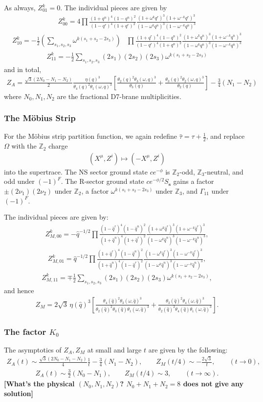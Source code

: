 \documentclass[12pt]{article}
\newcommand{\ie}{\begin{equation}\begin{aligned}}
\newcommand{\fe}{\end{aligned}\end{equation}}
\begin{document}
As always, $Z_{01}^k=0$. The individual pieces are given by
\ie
Z_{00}^k = 4\prod \frac{(1+q^n)^4(1-q^n)^2}{(1-q^r)^4(1+q^r)^2} \frac{(1+\omega^k q^r)^3(1+\omega^{-k}q^r)^3}{(1-\omega^kq^n)^3 (1-\omega^{-k}q^n)^3}
\fe
\ie
Z_{10}^k = -\frac{1}{2}\left(\sum_{s_1,s_2,s_3}\omega^{k(s_1+s_2-2s_3)}\right)&\prod \frac{(1+q^r)^4(1-q^n)^2}{(1-q^r)^4(1+q^n)^2}\frac{(1+\omega^k q^n)^3(1+\omega^{-k}q^n)^3}{(1-\omega^kq^n)^3 (1-\omega^{-k}q^n)^3}
\fe
\ie
Z_{11}^k =-\frac{1}{2}\sum_{s_1,s_2,s_3}(2s_1)(2s_2)(2s_3)\omega^{k(s_1+s_2-2s_3)}
\fe
and in total,
\ie
Z_A = \frac{\sqrt{3}(2N_0-N_1-N_2)}{2}
\frac{\eta(q)^3}{\theta_4(q)^2\theta_1(\omega,q)^3}
\left[
\frac{\theta_2(q)^2\theta_3(\omega,q)^3}{\theta_3(q)}
+
\frac{\theta_3(q)^2\theta_2(\omega,q)^3}{\theta_2(q)}
\right]
-\frac34(N_1-N_2)
\fe
where $N_0,N_1,N_2$ are the fractional D7-brane multiplicities.

\subsubsection*{The M\"obius Strip}

For the M\"obius strip partition function, we again redefine $\hat{\tau}=\tau + \frac{1}{2}$, and replace $\Omega$ with the $\mathbb{Z}_2$ charge
\ie
(X^\mu, Z^i)\mapsto (-X^\mu, Z^i)
\fe
into the supertrace. The NS sector ground state $ce^{-\phi}$ is $\mathbb{Z}_2$-odd, $\mathbb{Z}_3$-neutral, and odd under $(-1)^F$. The R-sector ground state $ce^{-\phi/2}S_\mathbf{s}$ gains a factor $\pm(2\nu_1)(2\nu_2)$ under $\mathbb{Z}_2$, a factor $\omega^{k(s_1+s_2-2s_3)}$ under $\mathbb{Z}_3$, and $\Gamma_{11}$ under $(-1)^F$. 

The individual pieces are given by:
\ie
Z_{M,00}^k = -\hat{q}^{-1/2}\prod \frac{(1-\hat{q}^r)^4(1-\hat{q}^n)^2}{(1+\hat{q}^n)^4(1+\hat{q}^r)^2} \frac{(1+\omega^k \hat{q}^r)^3(1+\omega^{-k} \hat{q}^r)^3}{(1-\omega^k \hat{q}^n)^3(1-\omega^{-k} \hat{q}^n)^3},
\fe
\ie
Z_{M,01}^k = \hat{q}^{-1/2}\prod \frac{(1+\hat{q}^r)^4(1-\hat{q}^n)^2}{(1+\hat{q}^n)^4(1-\hat{q}^r)^2} \frac{(1-\omega^k \hat{q}^r)^3(1-\omega^{-k} \hat{q}^r)^3}{(1-\omega^k \hat{q}^n)^3(1-\omega^{-k} \hat{q}^n)^3},
\fe
\ie
Z_{M,11}^k = \mp \frac{1}{2}\sum_{s_1,s_2,s_3}(2s_1)(2s_2)(2s_3)\omega^{k(s_1+s_2-2s_3)},
\fe
and hence
\ie
Z_M = 2\sqrt3\,\eta(\hat q)^3
\left[
\frac{\theta_4(\hat q)^2\theta_3(\omega,\hat q)^3}
{\theta_2(\hat q)^2\theta_3(\hat q)\theta_1(\omega,\hat q)^3}
+
\frac{\theta_3(\hat q)^2\theta_4(\omega,\hat q)^3}
{\theta_2(\hat q)^2\theta_4(\hat q)\theta_1(\omega,\hat q)^3}
\right].
\fe

\subsubsection*{The factor $K_0$}

The asymptotics of $Z_A, Z_M$ at small and large $t$ are given by the following:
\ie
Z_A(t)\sim \frac{\sqrt3(2N_0-N_1-N_2)}{4}\frac1t-\frac34(N_1-N_2),\qquad
Z_M(t/4)\sim -\frac{2\sqrt3}{t},
\qquad (t\to 0),
\fe
\ie
Z_A(t)\sim \frac32(N_0-N_1),\qquad
Z_M(t/4)\sim 3,\qquad (t\to\infty).
\fe
\textbf{[What's the physical $(N_0, N_1, N_2)$? $N_0+N_1+N_2=8$ does not give any solution]}
\end{document}
